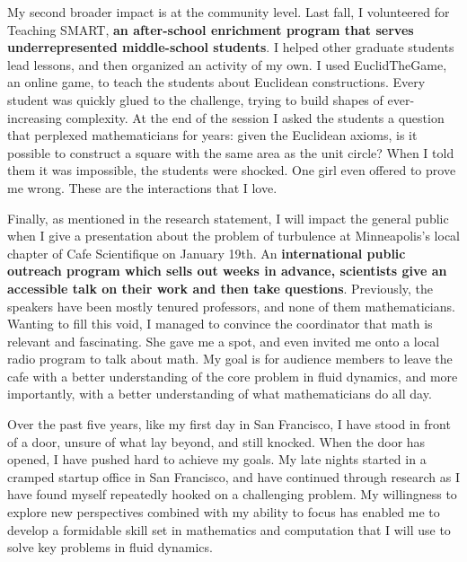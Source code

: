 \documentclass[12pt]{article}
\begin{document}
My second broader impact is at the community level. Last fall, I volunteered for Teaching SMART, \textbf{an after-school enrichment program that serves underrepresented middle-school students}. I helped other graduate students lead lessons, and then organized an activity of my own. I used EuclidTheGame, an online game, to teach the students about Euclidean constructions. Every student was quickly glued to the challenge, trying to build shapes of ever-increasing complexity. At the end of the session I asked the students a question that perplexed mathematicians for years: given the Euclidean axioms, is it possible to construct a square with the same area as the unit circle? When I told them it was impossible, the students were shocked. One girl even offered to prove me wrong. These are the interactions that I love. 

Finally, as mentioned in the research statement, I will impact the general public when I give a presentation about the problem of turbulence at Minneapolis's local chapter of Cafe Scientifique on January 19th. An \textbf{international public outreach program which sells out weeks in advance, scientists give an accessible talk on their work and then take questions}. Previously, the speakers have been mostly tenured professors, and none of them mathematicians. Wanting to fill this void, I managed to convince the coordinator that math is relevant and fascinating.  She gave me a spot, and even invited me onto a local radio program to talk about math. My goal is for audience members to leave the cafe with a better understanding of the core problem in fluid dynamics, and more importantly, with a better understanding of what mathematicians do all day.

Over the past five years, like my first day in San Francisco, I have stood in front of a door, unsure of what lay beyond, and still knocked. When the door has opened, I have pushed hard to achieve my goals. My late nights started in a cramped startup office in San Francisco, and have continued through research as I have found myself repeatedly hooked on a challenging problem. My willingness to explore new perspectives combined with my ability to focus has enabled me to develop a formidable skill set in mathematics and computation that I will use to solve key problems in fluid dynamics.
\end{document}
